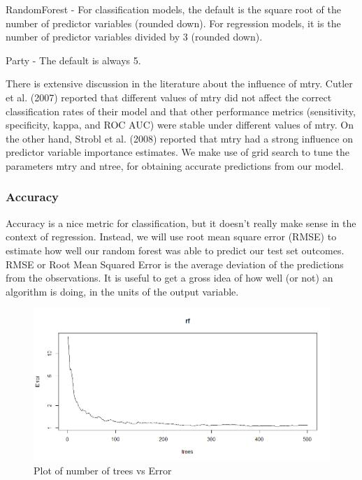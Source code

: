 RandomForest - For classification models, the default is the square root of the number of predictor variables (rounded down). For regression models, it is the number of predictor variables divided by 3 (rounded down).

Party - The default is always 5.

There is extensive discussion in the literature about the influence of mtry. Cutler et al. (2007) reported that different values of mtry did not affect the correct classification rates of their model and that other performance metrics (sensitivity, specificity, kappa, and ROC AUC) were stable under different values of mtry. On the other hand, Strobl et al. (2008) reported that mtry had a strong influence on predictor variable importance estimates.
We make use of grid search to tune the parameters mtry and ntree, for obtaining accurate predictions from our model.


\subsubsection{Accuracy}
Accuracy is a nice metric for classification, but it doesn’t really make sense in the context of regression. Instead, we will use root mean square error (RMSE) to estimate how well our random forest was able to predict our test set outcomes. RMSE or Root Mean Squared Error is the average deviation of the predictions from the observations. It is useful to get a gross idea of how well (or not) an algorithm is doing, in the units of the output variable.
\begin{figure}[h]
\label{ss}
\centering
\includegraphics[width= 10 cm]{rf_nooftrees_vs_error.png}
\caption{Plot of number of trees vs Error}
\end{figure}
\pagebreak

